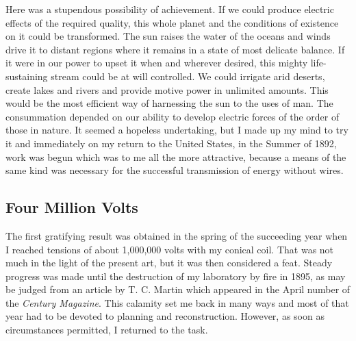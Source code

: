 \documentclass[a4paper,12pt,english,twoside,openright]{memoir}
\begin{document}
Here was a stupendous possibility of achievement.  If we could produce electric effects of the 
required quality, this whole planet and the conditions of existence on it could be transformed.  
The sun raises the water of the oceans and winds drive it to distant regions where it remains in a 
state of most delicate balance.  If it were in our power to upset it when and wherever desired, this 
mighty life-sustaining stream could be at will controlled.  We could irrigate arid deserts, create 
lakes and rivers and provide motive power in unlimited amounts.  This would be the most efficient 
way of harnessing the sun to the uses of man.  The consummation depended on our ability to 
develop electric forces of the order of those in nature.  It seemed a hopeless undertaking, but I 
made up my mind to try it and immediately on my return to the United States, in the Summer of 
1892, work was begun which was to me all the more attractive, because a means of the same 
kind was necessary for the successful transmission of energy without wires.  

\subsection{Four Million Volts}
The first gratifying result was obtained in the spring of the succeeding year when I reached 
tensions of about 1,000,000 volts with my conical coil.  That was not much in the light of the 
present art, but it was then considered a feat.  Steady progress was made until the destruction of 
my laboratory by fire in 1895, as may be judged from an article by T. C. Martin which appeared in 
the April number of the \emph{Century Magazine}.  This calamity set me back in many ways and most of 
that year had to be devoted to planning and reconstruction.  However, as soon as circumstances 
permitted, I returned to the task.  
\end{document}

